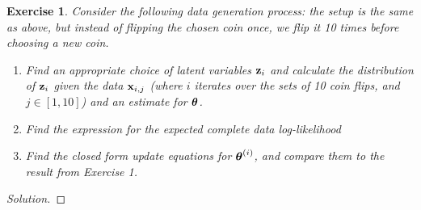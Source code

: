 \documentclass[12pt,letterpaper]{article}
\newtheorem{exercise}{Exercise}
\newenvironment{exercisesolution}
  {\begin{proof}[Solution]}
  {\end{proof}}
\begin{document}
\begin{exercise}
Consider the following data generation process: the setup is the same as above, but instead of flipping the chosen coin once, we flip it 10 times before choosing a new coin.

\begin{enumerate}
    \item Find an appropriate choice of latent variables $\mathbf{z}_i$ and calculate the distribution of $\mathbf{z}_i$ given the data $\mathbf{x}_{i,j}$ (where $i$ iterates over the sets of 10 coin flips, and $j \in [1, 10]$) and an estimate for $\boldsymbol{\theta}$.
    \item Find the expression for the expected complete data log-likelihood
    \item Find the closed form update equations for $\boldsymbol{\theta}^{(i)}$, and compare them to the result from Exercise 1.
\end{enumerate}
\end{exercise}
\begin{exercisesolution}
\end{exercisesolution}
\newpage
\end{document}
